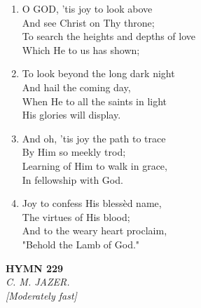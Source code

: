\begin{enumerate}
    \item O GOD, 'tis joy to look above \\
            And see Christ on Thy throne; \\
        To search the heights and depths of love \\
            Which He to us has shown;

    \item To look beyond the long dark night \\
            And hail the coming day, \\
        When He to all the saints in light \\
            His glories will display.

    \item And oh, 'tis joy the path to trace \\
            By Him so meekly trod; \\
        Learning of Him to walk in grace, \\
            In fellowship with God.

    \item Joy to confess His bless\`ed name, \\
            The virtues of His blood; \\
        And to the weary heart proclaim, \\
            "Behold the Lamb of God."

\end{enumerate}

\newpage
\begin{center}
    {\Large \textbf{HYMN 229}}
    \\
    \textit{C. M. JAZER.}
    \\
    \textit{\small [Moderately fast]}
\end{center}
\vspace{1em}

